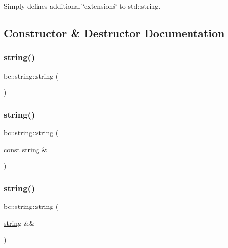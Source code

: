 Simply defines additional \char`\"{}extensions\char`\"{} to std\+::string. 

\subsection{Constructor \& Destructor Documentation}
\mbox{\label{structbc_1_1string_a319ddebd8b82a18c2beb42f6ea6a7486}} 
\subsubsection{\texorpdfstring{string()}{string()}\hspace{0.1cm}{\footnotesize\ttfamily [1/4]}}
{\footnotesize\ttfamily bc\+::string\+::string (\begin{DoxyParamCaption}{ }\end{DoxyParamCaption})\hspace{0.3cm}{\ttfamily [default]}}

\mbox{\label{structbc_1_1string_a8d252fb505358ae1114ce0f68f41cae0}} 
\subsubsection{\texorpdfstring{string()}{string()}\hspace{0.1cm}{\footnotesize\ttfamily [2/4]}}
{\footnotesize\ttfamily bc\+::string\+::string (\begin{DoxyParamCaption}\item[{const \hyperlink{structbc_1_1string}{string} \&}]{ }\end{DoxyParamCaption})\hspace{0.3cm}{\ttfamily [default]}}

\mbox{\label{structbc_1_1string_ad6d97f4a6ff8d2ce60d01d30884570fd}} 
\subsubsection{\texorpdfstring{string()}{string()}\hspace{0.1cm}{\footnotesize\ttfamily [3/4]}}
{\footnotesize\ttfamily bc\+::string\+::string (\begin{DoxyParamCaption}\item[{\hyperlink{structbc_1_1string}{string} \&\&}]{ }\end{DoxyParamCaption})\hspace{0.3cm}{\ttfamily [default]}}

